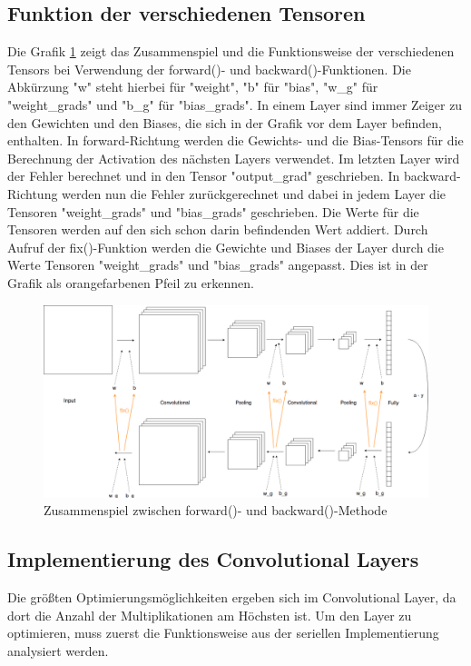 \documentclass[../main.tex]{subfiles}
\begin{document}
\subsection{Funktion der verschiedenen Tensoren}
Die Grafik \ref{fig:conv_forward_backward} zeigt das Zusammenspiel und die Funktionsweise der verschiedenen Tensors bei Verwendung der forward()- und backward()-Funktionen. Die Abkürzung "w" steht hierbei für "weight", "b" für "bias", "w\_g" für "weight\_grads" und "b\_g" für "bias\_grads". In einem Layer sind immer Zeiger zu den Gewichten und den Biases, die sich in der Grafik vor dem Layer befinden, enthalten. In forward-Richtung werden die Gewichts- und die Bias-Tensors für die Berechnung der Activation des nächsten Layers verwendet. Im letzten Layer wird der Fehler berechnet und in den Tensor "output\_grad" geschrieben. In backward-Richtung werden nun die Fehler zurückgerechnet und dabei in jedem Layer die Tensoren "weight\_grads" und "bias\_grads" geschrieben. Die Werte für die Tensoren werden auf den sich schon darin befindenden Wert addiert.
Durch Aufruf der fix()-Funktion werden die Gewichte und Biases der Layer durch die Werte Tensoren "weight\_grads" und "bias\_grads" angepasst. Dies ist in der Grafik als orangefarbenen Pfeil zu erkennen.
\begin{figure}[!htbp]
	\centering
	\includegraphics[width=\textwidth]{../images/Benz/forward_backward.png} %
	\caption{Zusammenspiel zwischen forward()- und backward()-Methode} 
	\label{fig:conv_forward_backward}
\end{figure}

\subsection{Implementierung des Convolutional Layers}

Die größten Optimierungsmöglichkeiten ergeben sich im Convolutional Layer, da dort die Anzahl der Multiplikationen am Höchsten ist. Um den Layer zu optimieren, muss zuerst die Funktionsweise aus der seriellen Implementierung analysiert werden.
\end{document}
